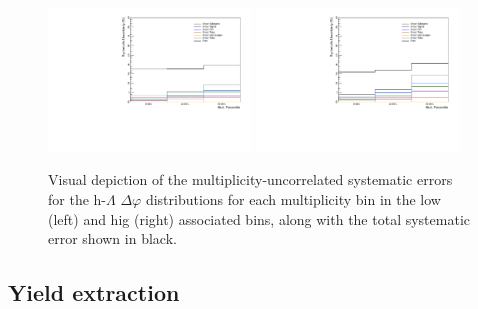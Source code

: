 \begin{figure}[ht]
    \centering
    \includegraphics[width=0.48\textwidth]{figures/analysis/nch_dep_systematics_dphi_postbarlow_lowpt.pdf}
    \includegraphics[width=0.48\textwidth]{figures/analysis/nch_dep_systematics_dphi_postbarlow_highpt.pdf}
    \caption{Visual depiction of the multiplicity-uncorrelated systematic errors for the h-$\Lambda$ $\Delta\varphi$ distributions for each multiplicity bin in the low (left) and hig (right) associated \pt bins, along with the total systematic error shown in black.}
    \label{fig:dphi_nch_dep_systematics_plots}
\end{figure}


\subsection{Yield extraction}
\label{sec:systematics_yield_extraction}

